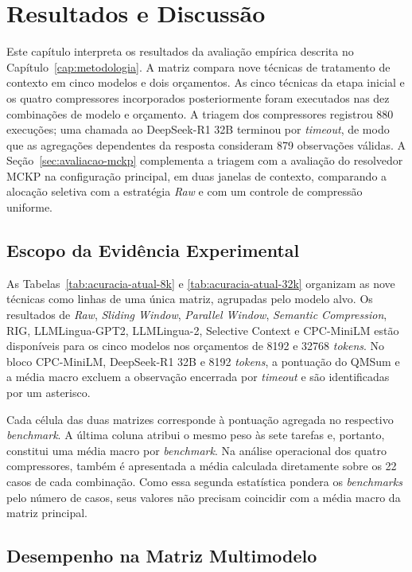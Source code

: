 \chapter{Resultados e Discussão}
\label{cap:resultados}

Este capítulo interpreta os resultados da avaliação empírica descrita no Capítulo~\ref{cap:metodologia}. A matriz compara nove técnicas de tratamento de contexto em cinco modelos e dois orçamentos. As cinco técnicas da etapa inicial e os quatro compressores incorporados posteriormente foram executados nas dez combinações de modelo e orçamento. A triagem dos compressores registrou 880 execuções; uma chamada ao DeepSeek-R1 32B terminou por \textit{timeout}, de modo que as agregações dependentes da resposta consideram 879 observações válidas. A Seção~\ref{sec:avaliacao-mckp} complementa a triagem com a avaliação do resolvedor MCKP na configuração principal, em duas janelas de contexto, comparando a alocação seletiva com a estratégia \textit{Raw} e com um controle de compressão uniforme.

\section{Escopo da Evidência Experimental}
\label{sec:analise-empirica}

As Tabelas~\ref{tab:acuracia-atual-8k} e \ref{tab:acuracia-atual-32k} organizam as nove técnicas como linhas de uma única matriz, agrupadas pelo modelo alvo. Os resultados de \textit{Raw}, \textit{Sliding Window}, \textit{Parallel Window}, \textit{Semantic Compression}, RIG, LLMLingua-GPT2, LLMLingua-2, Selective Context e CPC-MiniLM estão disponíveis para os cinco modelos nos orçamentos de 8192 e 32768 \textit{tokens}. No bloco CPC-MiniLM, DeepSeek-R1 32B e 8192 \textit{tokens}, a pontuação do QMSum e a média macro excluem a observação encerrada por \textit{timeout} e são identificadas por um asterisco.

Cada célula das duas matrizes corresponde à pontuação agregada no respectivo \textit{benchmark}. A última coluna atribui o mesmo peso às sete tarefas e, portanto, constitui uma média macro por \textit{benchmark}. Na análise operacional dos quatro compressores, também é apresentada a média calculada diretamente sobre os 22 casos de cada combinação. Como essa segunda estatística pondera os \textit{benchmarks} pelo número de casos, seus valores não precisam coincidir com a média macro da matriz principal.

\section{Desempenho na Matriz Multimodelo}
\label{sec:desempenho-multimodelo}

